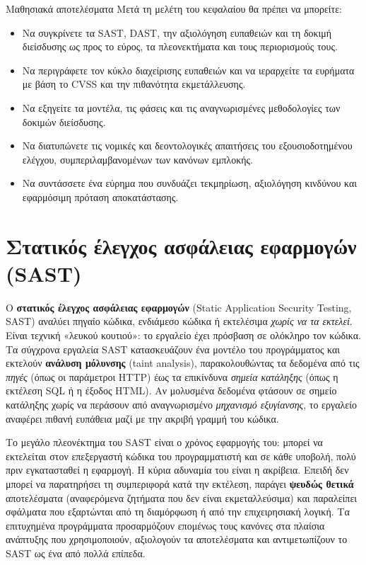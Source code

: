 \documentclass[11pt,openany]{book}
\begin{document}
\begin{outcomesbox}{Μαθησιακά αποτελέσματα}
Μετά τη μελέτη του κεφαλαίου θα πρέπει να μπορείτε:
\begin{itemize}
  \item Να συγκρίνετε τα SAST, DAST, την αξιολόγηση ευπαθειών και τη δοκιμή διείσδυσης ως προς το εύρος, τα πλεονεκτήματα και τους περιορισμούς τους.
  \item Να περιγράφετε τον κύκλο διαχείρισης ευπαθειών και να ιεραρχείτε τα ευρήματα με βάση το CVSS και την πιθανότητα εκμετάλλευσης.
  \item Να εξηγείτε τα μοντέλα, τις φάσεις και τις αναγνωρισμένες μεθοδολογίες των δοκιμών διείσδυσης.
  \item Να διατυπώνετε τις νομικές και δεοντολογικές απαιτήσεις του εξουσιοδοτημένου ελέγχου, συμπεριλαμβανομένων των κανόνων εμπλοκής.
  \item Να συντάσσετε ένα εύρημα που συνδυάζει τεκμηρίωση, αξιολόγηση κινδύνου και εφαρμόσιμη πρόταση αποκατάστασης.
\end{itemize}
\end{outcomesbox}

\section{Στατικός έλεγχος ασφάλειας εφαρμογών (SAST)}\label{sec:10.1}
Ο \textbf{στατικός έλεγχος ασφάλειας εφαρμογών} (Static Application Security Testing, SAST) αναλύει πηγαίο κώδικα, ενδιάμεσο κώδικα ή εκτελέσιμα \emph{χωρίς να τα εκτελεί}. Είναι τεχνική «λευκού κουτιού»: το εργαλείο έχει πρόσβαση σε ολόκληρο τον κώδικα. Τα σύγχρονα εργαλεία SAST κατασκευάζουν ένα μοντέλο του προγράμματος και εκτελούν \textbf{ανάλυση μόλυνσης} (taint analysis), παρακολουθώντας τα δεδομένα από τις \emph{πηγές} (όπως οι παράμετροι HTTP) έως τα επικίνδυνα \emph{σημεία κατάληξης} (όπως η εκτέλεση SQL ή η έξοδος HTML). Αν μολυσμένα δεδομένα φτάσουν σε σημείο κατάληξης χωρίς να περάσουν από αναγνωρισμένο \emph{μηχανισμό εξυγίανσης}, το εργαλείο αναφέρει πιθανή ευπάθεια μαζί με την ακριβή γραμμή του κώδικα.

Το μεγάλο πλεονέκτημα του SAST είναι ο χρόνος εφαρμογής του: μπορεί να εκτελείται στον επεξεργαστή κώδικα του προγραμματιστή και σε κάθε υποβολή, πολύ πριν εγκατασταθεί η εφαρμογή. Η κύρια αδυναμία του είναι η ακρίβεια. Επειδή δεν μπορεί να παρατηρήσει τη συμπεριφορά κατά την εκτέλεση, παράγει \textbf{ψευδώς θετικά} αποτελέσματα (αναφερόμενα ζητήματα που δεν είναι εκμεταλλεύσιμα) και παραλείπει σφάλματα που εξαρτώνται από τη διαμόρφωση ή από την επιχειρησιακή λογική. Τα επιτυχημένα προγράμματα προσαρμόζουν επομένως τους κανόνες στα πλαίσια ανάπτυξης που χρησιμοποιούν, αξιολογούν τα αποτελέσματα και αντιμετωπίζουν το SAST ως ένα από πολλά επίπεδα.
\end{document}

